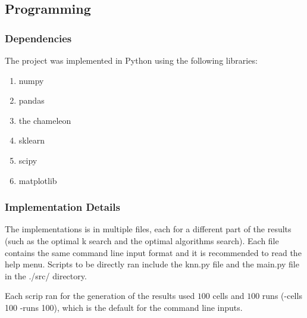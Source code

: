\documentclass[12pt, a4paper]{article}
\begin{document}
            \begin{multicols}{2}

            \subsection{Programming}\label{sub:Programming} %

                \subsubsection{Dependencies}

                    The project was implemented in Python \cite{noauthor_3132_nodate} using the following libraries:

                    \begin{enumerate}
                        \item numpy \cite{noauthor_numpy_nodate}
                        \item pandas \cite{noauthor_pandas_nodate}
                        \item the chameleon \cite{lin_moonpuckchameleon_cluster_2025}
                        \item sklearn \cite{noauthor_scikit-learn_nodate}
                        \item scipy \cite{noauthor_scipy_nodate}
                        \item matplotlib \cite{noauthor_matplotlib_nodate}
                    \end{enumerate}

                \subsubsection{Implementation Details}

                    The implementations is in multiple files, each for a different part of the results (such as the optimal k search and the optimal algorithms search). Each file contains the same command line input format and it is recommended to read the help menu. Scripts to be directly ran include the knn.py file and the main.py file in the ./src/ directory.
                    \newline

                    Each scrip ran for the generation of the results used $100$ cells and $100$ runs (-cells 100 -runs 100), which is the default for the command line inputs.
                    \newline


\end{multicols}
\end{document}
